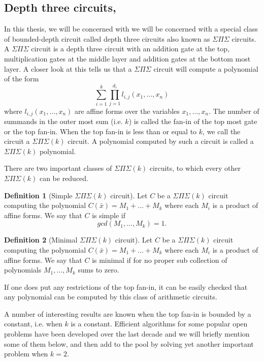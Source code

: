 \documentclass[12pt]{caltech_thesis}
\theoremstyle{plain}
\theoremstyle{definition}
\newtheorem{definition}{Definition}
\newcommand{\B}[1]{\bar{#1}}
\begin{document}
\subsection{Depth three circuits, \cite{SY10}}
In this thesis, we will be concerned with we will be concerned with a special class of bounded-depth circuit
called depth three circuits also known as $\Sigma\Pi\Sigma$ circuits. A $\Sigma\Pi\Sigma$ circuit is a depth three
circuit with an addition gate at the top, multiplication gates at the middle layer and 
addition gates at the bottom most layer. A closer look at this tells us that a $\Sigma\Pi\Sigma$ circuit will
compute a polynomial of the form
\begin{equation}\label{equation:sps}
 \sum_{i=1}^k \prod\limits_{j=1}^{d_i}l_{i,j}(x_1,\ldots,x_n)
\end{equation}
where $l_{i,j}(x_1,\ldots,x_n)$ are affine forms over the variables $x_1,\ldots,x_n$. The number of summands in the outer
most sum (i.e. $k$) is called the fan-in of the top most gate or the top fan-in. When the top fan-in is less than or equal to
$k$, we call the circuit a $\Sigma\Pi\Sigma(k)$ circuit. A polynomial computed by such a circuit is called a $\Sigma\Pi\Sigma(k)$
polynomial.

There are two important classes of $\Sigma\Pi\Sigma(k)$ circuits, to which every other $\Sigma\Pi\Sigma(k)$
can be reduced.

\begin{definition}[Simple $\Sigma\Pi\Sigma(k)$ circuit]
Let $C$ be a $\Sigma\Pi\Sigma(k)$ circuit computing the polynomial $C(\B{x}) = M_1+\ldots + M_k$ where each $M_i$
is a product of affine forms. We say that $C$ is simple if
\[
 gcd(M_1,\ldots,M_k)=1.
\]

\end{definition}

\begin{definition}[Minimal $\Sigma\Pi\Sigma(k)$ circuit]
 Let $C$ be a $\Sigma\Pi\Sigma(k)$ circuit computing the polynomial $C(\B{x}) = M_1+\ldots + M_k$ where each $M_i$
is a product of affine forms. We say that $C$ is minimal if for no proper sub collection of polynomials $M_1,\ldots,M_k$
sums to zero.
\end{definition}



If one does put any restrictions of the top fan-in, it can be easily checked that any polynomial can be computed by this class 
of arithmetic circuits.

A number of interesting results are known when the top fan-in is bounded by a constant, i.e. when $k$ is a constant. 
Efficient algorithms for some popular open problems have been developed over the last decade and we will 
briefly mention some of them below, and then add to the pool by solving yet another important problem when $k=2$. 
\end{document}
